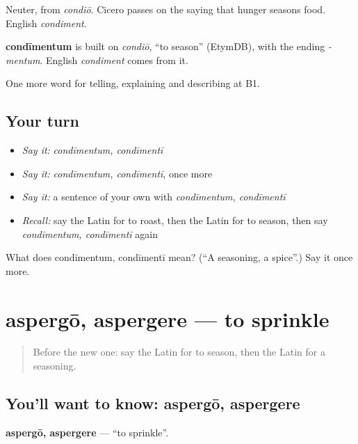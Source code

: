 Neuter, from \emph{condiō}. Cicero passes on the saying that hunger seasons food. English \emph{condiment}.

\begin{cousinweb}
\textbf{condīmentum} is built on \emph{condiō}, \textquotedblleft{}to season\textquotedblright{} (EtymDB), with the ending \emph{-mentum}. English \emph{condiment} comes from it.
\end{cousinweb}

\begin{grammarlens}[title={What you've built}]
One more word for telling, explaining and describing at B1.
\end{grammarlens}

\subsection*{Your turn}
\begin{itemize}
\raggedright
  \item \emph{Say it:} \emph{condīmentum, condīmentī}
  \item \emph{Say it:} \emph{condīmentum, condīmentī}, once more
  \item \emph{Say it:} a sentence of your own with \emph{condīmentum, condīmentī}
  \item \emph{Recall:} say the Latin for to roast, then the Latin for to season, then say \emph{condīmentum, condīmentī} again
\end{itemize}

\begin{tcolorbox}[breakable,colback=teal!4,colframe=teal!35!black,title={Before you move on}]
What does condīmentum, condīmentī mean? (\textquotedblleft{}A seasoning, a spice\textquotedblright{}.) Say it once more.
\end{tcolorbox}
\section[aspergō, aspergere]{aspergō, aspergere — to sprinkle}

\label{lesson:LA-C355-aspergo}



\begin{quote}
Before the new one: say the Latin for to season, then the Latin for a seasoning.
\end{quote}

\subsection*{You'll want to know: aspergō, aspergere}
\textbf{aspergō, aspergere} — \textquotedblleft{}to sprinkle\textquotedblright{}.

